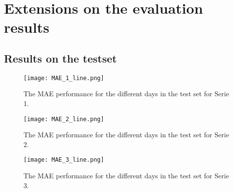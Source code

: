 \chapter{Extensions on the evaluation results}
\label{app:Extensions on the evaluation results}

\section{Results on the testset}

\begin{figure}[h]
	\centering
	\texttt{[image: MAE\_1\_line.png]}
	\caption{The MAE performance for the different days in the test set for Serie 1.}
	\label{fig:MAE_line_serie1}
\end{figure}

\begin{figure}[h]
	\centering
	\texttt{[image: MAE\_2\_line.png]}
	\caption{The MAE performance for the different days in the test set for Serie 2.}
	\label{fig:MAE_line_serie2}
\end{figure}	

\begin{figure}[h]
	\centering
	\texttt{[image: MAE\_3\_line.png]}
	\caption{The MAE performance for the different days in the test set for Serie 3.}
	\label{fig:MAE_line_serie3}
\end{figure}












